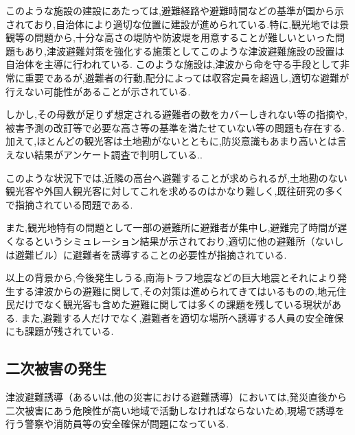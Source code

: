 このような施設の建設にあたっては,避難経路や避難時間などの基準が国から示されており,自治体により適切な位置に建設が進められている.特に,観光地では景観等の問題から,十分な高さの堤防や防波堤を用意することが難しいといった問題もあり,津波避難対策を強化する施策としてこのような津波避難施設の設置は自治体を主導に行われている.
このような施設は,津波から命を守る手段として非常に重要であるが,避難者の行動,配分によっては収容定員を超過し,適切な避難が行えない可能性があることが示されている\cite{kouti-01}.\par 

しかし,その母数が足りず想定される避難者の数をカバーしきれない等の指摘や,被害予測の改訂等で必要な高さ等の基準を満たせていない等の問題も存在する\cite{tsunami_evacuation_koshigoe}.
加えて,ほとんどの観光客は土地勘がないとともに,防災意識もあまり高いとは言えない結果がアンケート調査で判明している.\cite{visitor01}.

このような状況下では,近隣の高台へ避難することが求められるが,土地勘のない観光客や外国人観光客に対してこれを求めるのはかなり難しく,既往研究の多くで指摘されている問題である.\par 

また,観光地特有の問題として一部の避難所に避難者が集中し,避難完了時間が遅くなるというシミュレーション結果が示されており,適切に他の避難所（ないしは避難ビル）に避難者を誘導することの必要性が指摘されている\cite{kitahara2013tsunami}.


\vspace{\baselineskip}
以上の背景から,今後発生しうる,南海トラフ地震などの巨大地震とそれにより発生する津波からの避難に関して,その対策は進められてきてはいるものの,地元住民だけでなく観光客も含めた避難に関しては多くの課題を残している現状がある.
また,避難する人だけでなく,避難者を適切な場所へ誘導する人員の安全確保にも課題が残されている.


\subsection{二次被害の発生}
津波避難誘導（あるいは,他の災害における避難誘導）においては,発災直後から二次被害にあう危険性が高い地域で活動しなければならないため,現場で誘導を行う警察や消防員等の安全確保が問題になっている.\par
